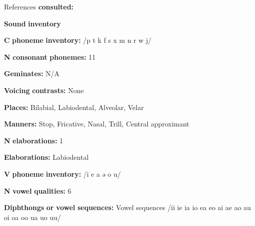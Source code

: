 \documentclass[output=paper]{langsci/langscibook}
\begin{document}
\begin{styleBody}
References \textbf{consulted:} \citet{Dol2007}
\end{styleBody}

\begin{styleBody}
\textbf{Sound} \textbf{inventory}
\end{styleBody}

\begin{styleBody}
\textbf{C} \textbf{phoneme} \textbf{inventory:} /p t k f s x m n r w j/
\end{styleBody}

\begin{styleBody}
\textbf{N} \textbf{consonant} \textbf{phonemes:} 11
\end{styleBody}

\begin{styleBody}
\textbf{Geminates:} N/A
\end{styleBody}

\begin{styleBody}
\textbf{Voicing} \textbf{contrasts:} None
\end{styleBody}

\begin{styleBody}
\textbf{Places:} Bilabial, Labiodental, Alveolar, Velar
\end{styleBody}

\begin{styleBody}
\textbf{Manners:} Stop, Fricative, Nasal, Trill, Central approximant
\end{styleBody}

\begin{styleBody}
\textbf{N} \textbf{elaborations:} 1
\end{styleBody}

\begin{styleBody}
\textbf{Elaborations:} Labiodental
\end{styleBody}

\begin{styleBody}
\textbf{V} \textbf{phoneme} \textbf{inventory:} /i e a ə o u/
\end{styleBody}

\begin{styleBody}
\textbf{N} \textbf{vowel} \textbf{qualities:} 6
\end{styleBody}

\begin{styleBody}
\textbf{Diphthongs} \textbf{or} \textbf{vowel} \textbf{sequences:} Vowel sequences /ii ie ia io ea eo ai ae ao au oi oa oo ua uo uu/
\end{styleBody}
\end{document}
